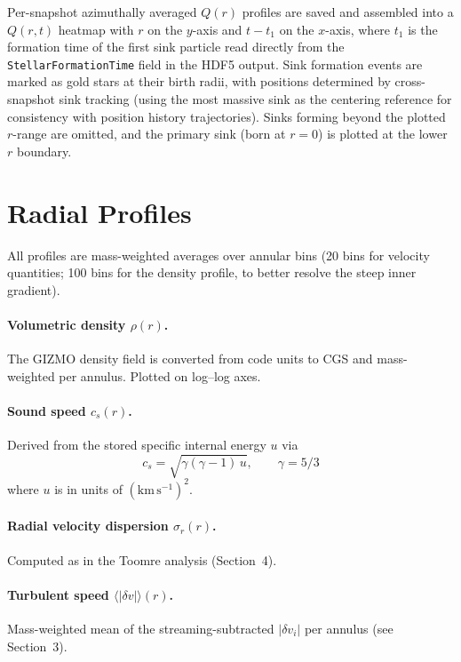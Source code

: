 \documentclass[12pt]{article}
\begin{document}
Per-snapshot azimuthally averaged $Q(r)$ profiles are saved and assembled into a
$Q(r,t)$ heatmap with $r$ on the $y$-axis and $t - t_1$ on the $x$-axis, where
$t_1$ is the formation time of the first sink particle read directly from the
\texttt{StellarFormationTime} field in the HDF5 output. Sink formation events are
marked as gold stars at their birth radii, with positions determined by
cross-snapshot sink tracking (using the most massive sink as the centering
reference for consistency with position history trajectories). Sinks forming
beyond the plotted $r$-range are omitted, and the primary sink (born at $r = 0$)
is plotted at the lower $r$ boundary.


\section{Radial Profiles}

All profiles are mass-weighted averages over annular bins (20 bins for velocity
quantities; 100 bins for the density profile, to better resolve the steep inner
gradient).

\paragraph{Volumetric density $\rho(r)$.}
The GIZMO density field is converted from code units to CGS and mass-weighted per
annulus. Plotted on log--log axes.

\paragraph{Sound speed $c_s(r)$.}
Derived from the stored specific internal energy $u$ via
\begin{equation}
    c_s = \sqrt{\gamma(\gamma - 1)\,u}, \qquad \gamma = 5/3
\end{equation}
where $u$ is in units of $(\mathrm{km\,s^{-1}})^2$.

\paragraph{Radial velocity dispersion $\sigma_r(r)$.}
Computed as in the Toomre analysis (Section~4).

\paragraph{Turbulent speed $\langle|\delta v|\rangle(r)$.}
Mass-weighted mean of the streaming-subtracted $|\delta v_i|$ per annulus (see
Section~3).
\end{document}
